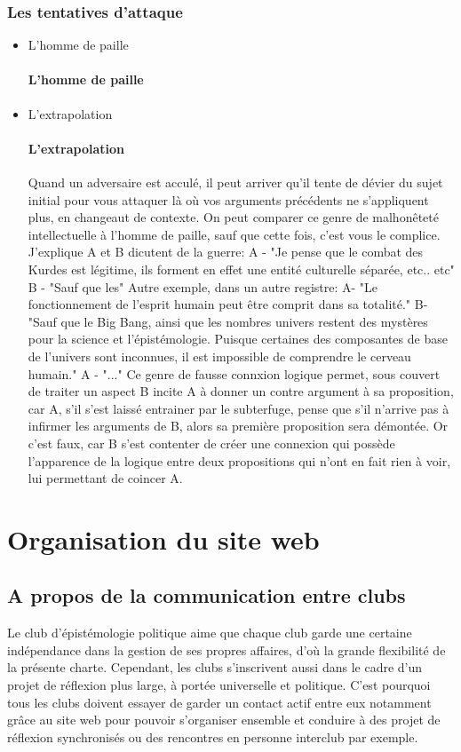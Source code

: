 \documentclass[a4paper,12pt]{article}
\begin{document}
\subsubsection {Les tentatives d'attaque}
\begin{itemize}
 \item L'homme de paille
 \paragraph{L'homme de paille}
 \item L'extrapolation
 \paragraph{L'extrapolation}
Quand un adversaire est acculé, il peut arriver qu'il tente de dévier du sujet initial pour vous attaquer là où vos arguments précédents ne s'appliquent plus, en changeaut de contexte. On peut comparer ce genre de malhonêteté intellectuelle à l'homme de paille, sauf que cette fois, c'est vous le complice. J'explique A et B dicutent de la guerre: A - "Je pense que le combat des Kurdes est légitime, ils forment en effet une entité culturelle séparée, etc.. etc" B - "Sauf que les" 
Autre exemple, dans un autre registre:
A- "Le fonctionnement de l'esprit humain peut être comprit dans sa totalité." B- "Sauf que le Big Bang, ainsi que les nombres univers restent des mystères pour la science et l'épistémologie. Puisque certaines des composantes de base de l'univers sont inconnues, il est impossible de comprendre le cerveau humain." A - "..."
    Ce genre de fausse connxion logique permet, sous couvert de traiter un aspect 
    B incite A à donner un contre argument à sa proposition, car A, s'il s'est laissé entrainer par le subterfuge, pense que s'il n'arrive pas à infirmer les arguments de B, alors sa première proposition sera démontée. Or c'est faux, car B s'est contenter de créer une connexion qui possède l'apparence de la logique entre deux propositions qui n'ont en fait rien à voir, lui permettant de coincer A.
\end{itemize}

\section{Organisation du site web}

\subsection{A propos de la communication entre clubs}
Le club d'épistémologie politique aime que chaque club garde une certaine indépendance dans la gestion de ses propres affaires, d'où la grande flexibilité de la présente charte. Cependant, les clubs s'inscrivent aussi dans le cadre d'un projet de réflexion plus large, à portée universelle et politique. C'est pourquoi tous les clubs doivent essayer de garder un contact actif entre eux notamment grâce au site web pour pouvoir s'organiser ensemble et conduire à des projet de réflexion synchronisés ou des rencontres en personne interclub par exemple.
\end{document}
